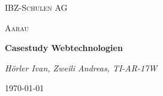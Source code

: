 \begin{titlepage}
    \centering
    {\scshape\LARGE IBZ-Schulen AG\par}
    {\scshape\Large Aarau\par}
    \vspace{1.5cm}
    {\huge\bfseries Casestudy Webtechnologien\par}
    \vspace{2cm}
    {\Large\itshape Hörler Ivan, Zweili Andreas, TI-AR-17W\par}
    \vfill

    {\large \today\par}
\thispagestyle{empty}
\end{titlepage}

